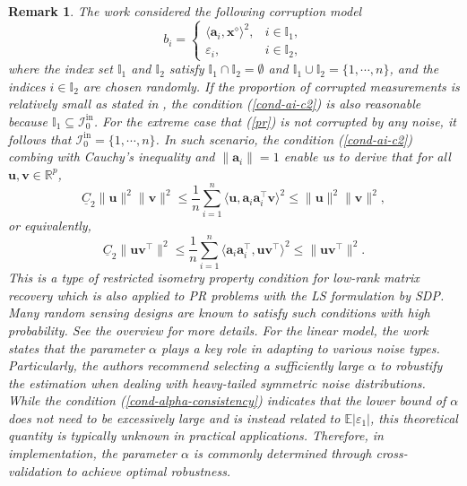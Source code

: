 \documentclass{article}
\newtheorem{remark}{Remark}
\numberwithin{equation}{section}
\begin{document}
 \begin{remark}\label{explanation-con}  
 The work \cite{duchi2019solving} considered the following corruption model
\begin{equation}\nonumber
	b_i =
	\begin{cases}
		\langle \mathbf{a}_i, \mathbf{x}^\diamond\rangle^2,& i\in\mathbb{I}_1,\\
		{\varepsilon_i,}&{i\in\mathbb{I}_2},
	\end{cases}
\end{equation}	
where the index set $\mathbb{I}_1$ and $\mathbb{I}_2$ satisfy $\mathbb{I}_1\cap\mathbb{I}_2=\emptyset$ and $\mathbb{I}_1\cup\mathbb{I}_2=\{1,\cdots,n\}$, and the indices $i\in\mathbb{I}_2$ are chosen randomly. If the proportion of corrupted measurements is relatively small as stated in \cite{duchi2019solving}, the condition (\ref{cond-ai-c2}) is also reasonable because $ \mathbb{I}_1\subseteq\mathcal{I}_{0}^{\mathrm{in}}$.  
For the extreme case that (\ref{pr}) is not corrupted by any noise, it follows that $\mathcal{I}_{0}^{\mathrm{in}}=\{1,\cdots,n\}$.  In such scenario, the condition (\ref{cond-ai-c2}) combing with Cauchy's inequality and $\|\mathbf{a}_i\|=1$ enable us to derive that for all $\mathbf{u}, \mathbf{v}\in\mathbb{R}^p$,
$$\underline{C}_2\|\mathbf{u}\| ^2\|\mathbf{v}\| ^2\leq\frac{1}{n}\sum_{i=1}^n\langle \mathbf{u}, \mathbf{a}_i\mathbf{a}_i^\top\mathbf{v}\rangle^2\leq\|\mathbf{u}\| ^2\|\mathbf{v}\| ^2,$$
or equivalently,
$$\underline{C}_2\|\mathbf{u}\mathbf{v}^\top\| ^2\leq\frac{1}{n}\sum_{i=1}^n\langle \mathbf{a}_i\mathbf{a}_i^\top, \mathbf{u}\mathbf{v}^\top\rangle^2\leq\|\mathbf{u}\mathbf{v}^\top\| ^2.$$
This is a type of restricted isometry property condition for low-rank matrix recovery which is also applied to PR problems with the LS formulation by SDP. Many random sensing designs are known to satisfy such conditions with high probability. See the overview  \cite{chi2019nonconvex} for more details.
For the linear model,  the work \cite{fan2017estimation} states that the parameter $\alpha$ plays a key role in adapting to various noise types. Particularly, the authors recommend selecting a sufficiently large  $\alpha$ to robustify the estimation when dealing with heavy-tailed symmetric noise distributions. While the condition (\ref{cond-alpha-consistency}) indicates that the lower bound of $\alpha$ does not need to be excessively large and is instead related to $\mathbb{E}|\varepsilon_1|$, this theoretical quantity is typically unknown in practical applications. Therefore, in implementation, the parameter 
$\alpha$ is commonly determined through cross-validation to achieve optimal robustness.
\end{remark}
\end{document}
